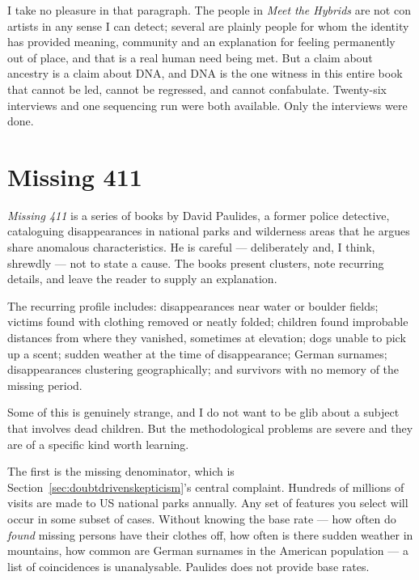 I take no pleasure in that paragraph. The people in \emph{Meet the Hybrids} are not con artists
in any sense I can detect; several are plainly people for whom the identity has provided
meaning, community and an explanation for feeling permanently out of place, and that is a real
human need being met. But a claim about ancestry is a claim about DNA, and DNA is the one witness
in this entire book that cannot be led, cannot be regressed, and cannot confabulate. Twenty-six
interviews and one sequencing run were both available. Only the interviews were done.

\section{Missing 411}\label{sec:missing411}

\emph{Missing 411} is a series of books by David Paulides, a former police detective, cataloguing
disappearances in national parks and wilderness areas that he argues share anomalous
characteristics. He is careful --- deliberately and, I think, shrewdly --- not to state a cause.
The books present clusters, note recurring details, and leave the reader to supply an
explanation.

The recurring profile includes: disappearances near water or boulder fields; victims found with
clothing removed or neatly folded; children found improbable distances from where they vanished,
sometimes at elevation; dogs unable to pick up a scent; sudden weather at the time of
disappearance; German surnames; disappearances clustering geographically; and survivors with no
memory of the missing period.

Some of this is genuinely strange, and I do not want to be glib about a subject that involves
dead children. But the methodological problems are severe and they are of a specific kind worth
learning.

The first is the missing denominator, which is Section~\ref{sec:doubtdrivenskepticism}'s central complaint. Hundreds of
millions of visits are made to US national parks annually. Any set of features you select will
occur in some subset of cases. Without knowing the base rate --- how often do \emph{found}
missing persons have their clothes off, how often is there sudden weather in mountains, how
common are German surnames in the American population --- a list of coincidences is
unanalysable. Paulides does not provide base rates.

